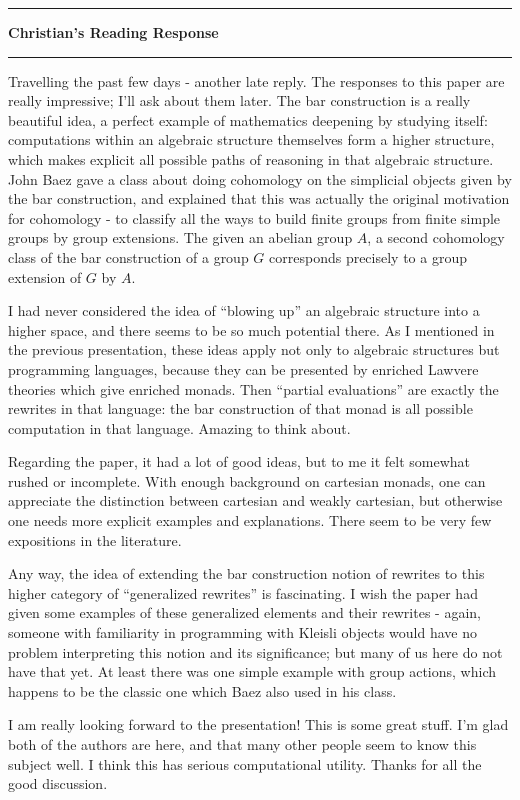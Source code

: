 \documentclass{amsart}
\newcommand{\iam}[1]{
  \vspace{0.25em}
  \hrule
  \vspace{0.25em}
  \textbf{{#1}'s Reading Response}
  \vspace{0.25em}
  \hrule
  \vspace{1em}
}
\begin{document}
\iam{Christian}

Travelling the past few days - another late reply. The responses to this paper are really impressive; I'll ask about them later. The bar construction is a really beautiful idea, a perfect example of mathematics deepening by studying itself: computations within an algebraic structure themselves form a higher structure, which makes explicit all possible paths of reasoning in that algebraic structure. John Baez gave a class about doing cohomology on the simplicial objects given by the bar construction, and explained that this was actually the original motivation for cohomology - to classify all the ways to build finite groups from finite simple groups by group extensions. The given an abelian group $A$, a second cohomology class of the bar construction of a group $G$ corresponds precisely to a group extension of $G$ by $A$.

I had never considered the idea of ``blowing up'' an algebraic structure into a higher space, and there seems to be so much potential there. As I mentioned in the previous presentation, these ideas apply not only to algebraic structures but programming languages, because they can be presented by enriched Lawvere theories which give enriched monads. Then ``partial evaluations'' are exactly the rewrites in that language: the bar construction of that monad is all possible computation in that language. Amazing to think about.

Regarding the paper, it had a lot of good ideas, but to me it felt somewhat rushed or incomplete. With enough background on cartesian monads, one can appreciate the distinction between cartesian and weakly cartesian, but otherwise one needs more explicit examples and explanations. There seem to be very few expositions in the literature.

Any way, the idea of extending the bar construction notion of rewrites to this higher category of ``generalized rewrites'' is fascinating. I wish the paper had given some examples of these generalized elements and their rewrites - again, someone with familiarity in programming with Kleisli objects would have no problem interpreting this notion and its significance; but many of us here do not have that yet. At least there was one simple example with group actions, which happens to be the classic one which Baez also used in his class.

I am really looking forward to the presentation! This is some great stuff. I'm glad both of the authors are here, and that many other people seem to know this subject well. I think this has serious computational utility. Thanks for all the good discussion.
\end{document}
